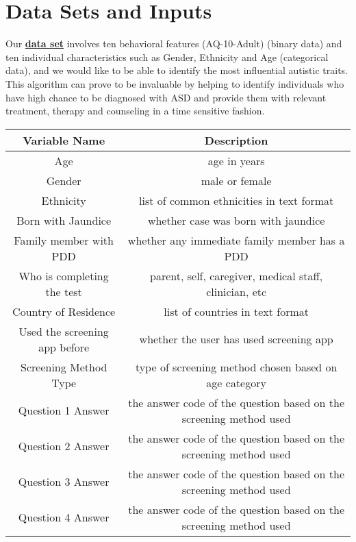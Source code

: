 \documentclass[12pt, oneside]{article}
\theoremstyle{definition}
\begin{document}
\section{Data Sets and Inputs}
Our \href{https://archive.ics.uci.edu/ml/datasets/Autistic+Spectrum+Disorder+Screening+Data+for+Adolescent+++}{\textbf{data set}} involves ten behavioral features (AQ-10-Adult) (binary data) and ten individual characteristics such as Gender, Ethnicity and Age (categorical data), and we would like to be able to identify the most influential autistic traits. This algorithm can prove to be invaluable by helping to identify individuals who have high chance to be diagnosed with ASD and provide them with relevant treatment, therapy and counseling in a time sensitive fashion. \begin{center}
\begin{table}[h]
\begin{adjustbox}{width=1\textwidth}
\begin{tabular}{ |c|c|} 
\hline
Variable Name  & Description\\ \hline
Age &age in years \\  \hline
Gender &  male or female \\  \hline
Ethnicity & list of common ethnicities in text format \\  \hline
Born with Jaundice & whether case was born with jaundice  \\  \hline
Family member with PDD &  whether any immediate family member has a PDD \\  \hline
Who is completing the test & parent, self, caregiver, medical staff, clinician, etc \\  \hline
Country of Residence & list of countries in text format \\  \hline
Used the screening app before & whether the user has used screening app \\  \hline
Screening Method Type & type of screening method chosen based on age category \\  \hline
Question 1 Answer  & the answer code of the question based on the screening method used \\  \hline
Question 2 Answer & the answer code of the question based on the screening method used \\  \hline
Question 3 Answer &  the answer code of the question based on the screening method used \\  \hline
Question 4 Answer & the answer code of the question based on the screening method used \\  \hline

\end{tabular}
\end{adjustbox}
\end{table}
\end{center}
\end{document}
